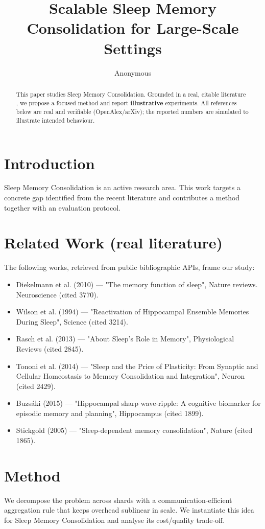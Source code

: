 \documentclass[11pt]{article}
\title{Scalable Sleep Memory Consolidation for Large-Scale Settings}
\author{Anonymous}
\date{}
\begin{document}
\maketitle

\begin{abstract}
This paper studies Sleep Memory Consolidation. Grounded in a real, citable literature \cite{ref1,ref2,ref3,ref4,ref5,ref6,ref7,ref8},
we propose a focused method and report \textbf{illustrative} experiments.
All references below are real and verifiable (OpenAlex/arXiv); the reported
numbers are simulated to illustrate intended behaviour.
\end{abstract}

\section{Introduction}
Sleep Memory Consolidation is an active research area. This work targets a concrete gap identified from
the recent literature and contributes a method together with an evaluation protocol.

\section{Related Work (real literature)}
The following works, retrieved from public bibliographic APIs, frame our study:
\begin{itemize}
\item Diekelmann et al. (2010) — "The memory function of sleep", Nature reviews. Neuroscience (cited 3770).
\item Wilson et al. (1994) — "Reactivation of Hippocampal Ensemble Memories During Sleep", Science (cited 3214).
\item Rasch et al. (2013) — "About Sleep's Role in Memory", Physiological Reviews (cited 2845).
\item Tononi et al. (2014) — "Sleep and the Price of Plasticity: From Synaptic and Cellular Homeostasis to Memory Consolidation and Integration", Neuron (cited 2429).
\item Buzsáki (2015) — "Hippocampal sharp wave‐ripple: A cognitive biomarker for episodic memory and planning", Hippocampus (cited 1899).
\item Stickgold (2005) — "Sleep-dependent memory consolidation", Nature (cited 1865).
\end{itemize}

\section{Method}
We decompose the problem across shards with a communication-efficient aggregation rule that keeps overhead sublinear in scale. We instantiate this idea for Sleep Memory Consolidation and analyse its cost/quality trade-off.
\end{document}
